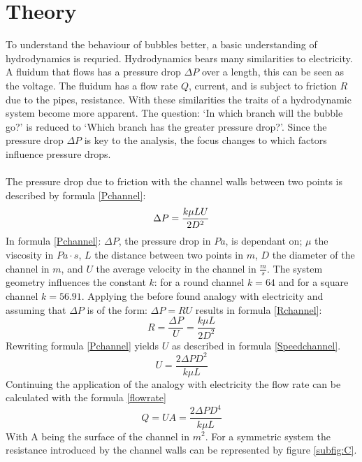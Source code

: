 \section{Theory}
\label{theory}
To understand the behaviour of bubbles better, a basic understanding of hydrodynamics is requried. Hydrodynamics bears many similarities to electricity. A fluidum that flows has a pressure drop  $\Delta P$ over a length, this can be seen as the voltage. The fluidum has a flow rate $Q$, current, and is subject to friction $R$ due to the pipes, resistance. With these similarities the traits of a hydrodynamic system become more apparent. The question: `In which branch will the bubble go?'  is reduced to `Which branch has the greater pressure drop?'. Since the pressure drop $\Delta P$ is key to the analysis, the focus changes to which factors influence pressure drops. \\
\\
The pressure drop due to friction with the channel walls between two points is described by formula \ref{Pchannel}:
\begin{equation}
\protect\label{Pchannel}
\protect\Delta P =\protect\frac{k \protect\mu L U}{2D^2}
\end{equation}  
In formula \ref{Pchannel}: $\Delta P$, the pressure drop in $Pa$, is dependant on; $\mu$ the viscosity in $Pa \cdot s$, $L$ the distance between two points in $m$, $D$ the diameter of the channel in $m$, and $U$ the average velocity in the channel in $\frac{m}{s}$. The system geometry influences the constant $k$: for a round channel $k = 64$ and for a square channel $k=56.91$. 
Applying the before found analogy with electricity and assuming that $\Delta P$ is of the form: $\Delta P = R U$ results in formula \ref{Rchannel}:
\begin{equation}
R= \frac{\Delta P}{U} = \frac{k \mu L}{2D^2}
\label{Rchannel}
\end{equation}
Rewriting formula \ref{Pchannel} yields $U$ as described in formula \ref{Speedchannel}.
\begin{equation}
U= \frac{2\Delta P D^2}{k \mu L}
\label{Speedchannel}
\end{equation}
Continuing the application of the analogy with electricity the flow rate can be calculated with the formula \ref{flowrate}
\begin{equation}
Q =U A = \frac{2 \Delta P D^4}{k \mu L}
\label {flowrate}
\end{equation}
With A being the surface of the channel in $m^2$.
For a symmetric system the resistance introduced by the channel walls can be represented by figure \ref{subfig:C}.
